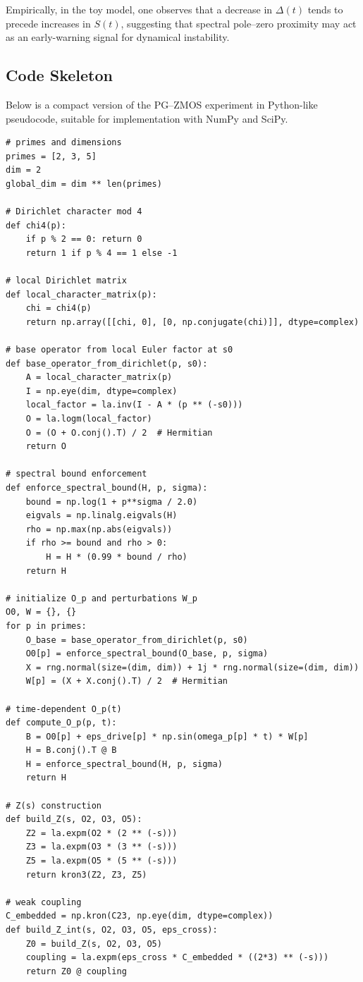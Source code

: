 \documentclass[11pt]{article}
\begin{document}
Empirically, in the toy model, one observes that a decrease in
$\Delta(t)$ tends to precede increases in $S(t)$, suggesting that
spectral pole--zero proximity may act as an early-warning signal for
dynamical instability.

\subsection{Code Skeleton}

Below is a compact version of the PG--ZMOS experiment in Python-like
pseudocode, suitable for implementation with NumPy and SciPy.

\begin{verbatim}
# primes and dimensions
primes = [2, 3, 5]
dim = 2
global_dim = dim ** len(primes)

# Dirichlet character mod 4
def chi4(p):
    if p % 2 == 0: return 0
    return 1 if p % 4 == 1 else -1

# local Dirichlet matrix
def local_character_matrix(p):
    chi = chi4(p)
    return np.array([[chi, 0], [0, np.conjugate(chi)]], dtype=complex)

# base operator from local Euler factor at s0
def base_operator_from_dirichlet(p, s0):
    A = local_character_matrix(p)
    I = np.eye(dim, dtype=complex)
    local_factor = la.inv(I - A * (p ** (-s0)))
    O = la.logm(local_factor)
    O = (O + O.conj().T) / 2  # Hermitian
    return O

# spectral bound enforcement
def enforce_spectral_bound(H, p, sigma):
    bound = np.log(1 + p**sigma / 2.0)
    eigvals = np.linalg.eigvals(H)
    rho = np.max(np.abs(eigvals))
    if rho >= bound and rho > 0:
        H = H * (0.99 * bound / rho)
    return H

# initialize O_p and perturbations W_p
O0, W = {}, {}
for p in primes:
    O_base = base_operator_from_dirichlet(p, s0)
    O0[p] = enforce_spectral_bound(O_base, p, sigma)
    X = rng.normal(size=(dim, dim)) + 1j * rng.normal(size=(dim, dim))
    W[p] = (X + X.conj().T) / 2  # Hermitian

# time-dependent O_p(t)
def compute_O_p(p, t):
    B = O0[p] + eps_drive[p] * np.sin(omega_p[p] * t) * W[p]
    H = B.conj().T @ B
    H = enforce_spectral_bound(H, p, sigma)
    return H

# Z(s) construction
def build_Z(s, O2, O3, O5):
    Z2 = la.expm(O2 * (2 ** (-s)))
    Z3 = la.expm(O3 * (3 ** (-s)))
    Z5 = la.expm(O5 * (5 ** (-s)))
    return kron3(Z2, Z3, Z5)

# weak coupling
C_embedded = np.kron(C23, np.eye(dim, dtype=complex))
def build_Z_int(s, O2, O3, O5, eps_cross):
    Z0 = build_Z(s, O2, O3, O5)
    coupling = la.expm(eps_cross * C_embedded * ((2*3) ** (-s)))
    return Z0 @ coupling


\end{verbatim}
\end{document}
